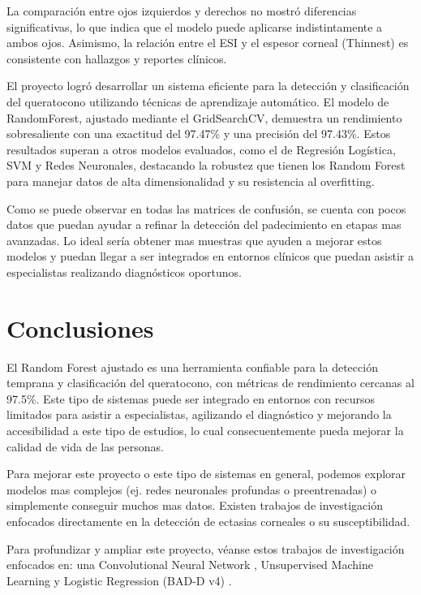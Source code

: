 \documentclass{replab}
\begin{document}
La comparación entre ojos izquierdos y derechos no mostró diferencias significativas, lo que indica que el modelo puede aplicarse indistintamente a ambos ojos. Asimismo, la relación entre el ESI y el espesor corneal (Thinnest) es consistente con hallazgos y reportes clínicos.

El proyecto logró desarrollar un sistema eficiente para la detección y clasificación del queratocono utilizando técnicas de aprendizaje automático. El modelo de RandomForest, ajustado mediante el GridSearchCV, demuestra un rendimiento sobresaliente con una exactitud del 97.47\% y una precisión del 97.43\%. Estos resultados superan a otros modelos evaluados, como el de Regresión Logística, SVM y Redes Neuronales, destacando la robustez que tienen los Random Forest para manejar datos de alta dimensionalidad y su resistencia al overfitting.

Como se puede observar en todas las matrices de confusión, se cuenta con pocos datos que puedan ayudar a refinar la detección del padecimiento en etapas mas avanzadas. Lo ideal sería obtener mas muestras que ayuden a mejorar estos modelos y puedan llegar a ser integrados en entornos clínicos que puedan asistir a especialistas realizando diagnósticos oportunos.

\section{Conclusiones}

El Random Forest ajustado es una herramienta confiable para la detección temprana y clasificación del queratocono, con métricas de rendimiento cercanas al 97.5\%. Este tipo de sistemas puede ser integrado en entornos con recursos limitados para asistir a especialistas, agilizando el diagnóstico y mejorando la accesibilidad a este tipo de estudios, lo cual consecuentemente pueda mejorar la calidad de vida de las personas.

Para mejorar este proyecto o este tipo de sistemas en general, podemos explorar modelos mas complejos (ej. redes neuronales profundas o preentrenadas) o simplemente conseguir muchos mas datos. Existen trabajos de investigación enfocados directamente en la detección	de ectasias corneales o su susceptibilidad.

Para profundizar y ampliar este proyecto, véanse estos trabajos de investigación enfocados en: una Convolutional Neural Network \cite{mirsalehi}, Unsupervised Machine Learning \cite{yousefi} y Logistic Regression (BAD-D v4) \cite{lopes}.
\end{document}
